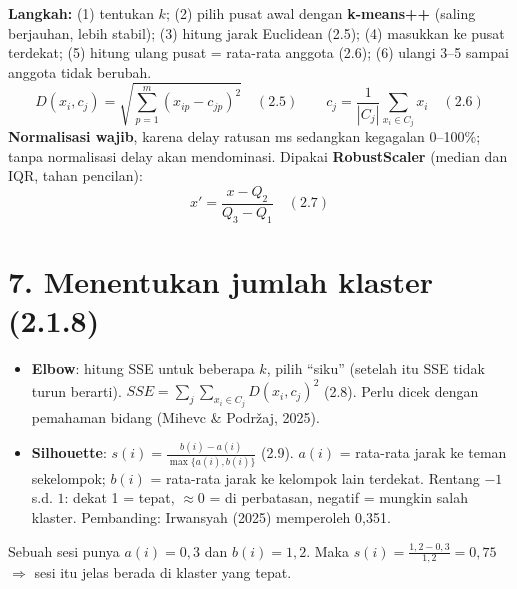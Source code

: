 \textbf{Langkah:} (1) tentukan $k$; (2) pilih pusat awal dengan \textbf{k-means++} (saling berjauhan, lebih stabil); (3) hitung jarak Euclidean (2.5); (4) masukkan ke pusat terdekat; (5) hitung ulang pusat = rata-rata anggota (2.6); (6) ulangi 3--5 sampai anggota tidak berubah.
\[
D(x_i,c_j)=\sqrt{\sum_{p=1}^{m}(x_{ip}-c_{jp})^2}\quad(2.5)\qquad
c_j=\frac{1}{|C_j|}\sum_{x_i\in C_j}x_i\quad(2.6)
\]
\textbf{Normalisasi wajib}, karena delay ratusan ms sedangkan kegagalan 0--100\%; tanpa normalisasi delay akan mendominasi. Dipakai \textbf{RobustScaler} (median dan IQR, tahan pencilan):
\[x'=\frac{x-Q_2}{Q_3-Q_1}\quad(2.7)\]

\section*{7. Menentukan jumlah klaster (2.1.8)}
\begin{itemize}
  \item \textbf{Elbow}: hitung SSE untuk beberapa $k$, pilih ``siku'' (setelah itu SSE tidak turun berarti). $SSE=\sum_{j}\sum_{x_i\in C_j}D(x_i,c_j)^2$ (2.8). Perlu dicek dengan pemahaman bidang (Mihevc \& Podržaj, 2025).
  \item \textbf{Silhouette}: $s(i)=\frac{b(i)-a(i)}{\max\{a(i),b(i)\}}$ (2.9). $a(i)$ = rata-rata jarak ke teman sekelompok; $b(i)$ = rata-rata jarak ke kelompok lain terdekat. Rentang $-1$ s.d. $1$: dekat 1 = tepat, $\approx 0$ = di perbatasan, negatif = mungkin salah klaster. Pembanding: Irwansyah (2025) memperoleh 0,351.
\end{itemize}
\begin{contoh}[silhouette]
Sebuah sesi punya $a(i)=0{,}3$ dan $b(i)=1{,}2$. Maka $s(i)=\frac{1{,}2-0{,}3}{1{,}2}=0{,}75$ $\Rightarrow$ sesi itu jelas berada di klaster yang tepat.
\end{contoh}

